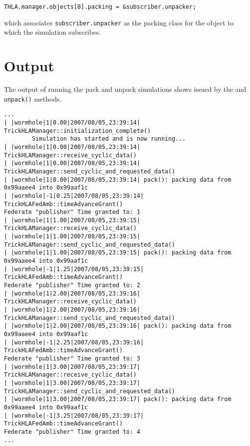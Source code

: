\begin{verbatim}
THLA.manager.objects[0].packing = &subscriber.unpacker; \end{verbatim}

which associates {\tt subscriber.unpacker} as the packing class for
the object to which the simulation subscribes.

\section{Output}

The output of running the pack and unpack simulations
shows issued by the  and
{\tt unpack()} methods.

\begin{lstlisting}[numbers=none,caption={Output from the packer simulation}]
...
| |wormhole|1|0.00|2007/08/05,23:39:14| TrickHLAManager::initialization_complete()
        Simulation has started and is now running...
| |wormhole|1|0.00|2007/08/05,23:39:14| TrickHLAManager::receive_cyclic_data()
| |wormhole|1|0.00|2007/08/05,23:39:14| TrickHLAManager::send_cyclic_and_requested_data()
| |wormhole|1|0.00|2007/08/05,23:39:14| pack(): packing data from 0x99aaee4 into 0x99aaf1c
| |wormhole|-1|0.25|2007/08/05,23:39:14| TrickHLAFedAmb::timeAdvanceGrant()
Federate "publisher" Time granted to: 1
| |wormhole|1|1.00|2007/08/05,23:39:15| TrickHLAManager::receive_cyclic_data()
| |wormhole|1|1.00|2007/08/05,23:39:15| TrickHLAManager::send_cyclic_and_requested_data()
| |wormhole|1|1.00|2007/08/05,23:39:15| pack(): packing data from 0x99aaee4 into 0x99aaf1c
| |wormhole|-1|1.25|2007/08/05,23:39:15| TrickHLAFedAmb::timeAdvanceGrant()
Federate "publisher" Time granted to: 2
| |wormhole|1|2.00|2007/08/05,23:39:16| TrickHLAManager::receive_cyclic_data()
| |wormhole|1|2.00|2007/08/05,23:39:16| TrickHLAManager::send_cyclic_and_requested_data()
| |wormhole|1|2.00|2007/08/05,23:39:16| pack(): packing data from 0x99aaee4 into 0x99aaf1c
| |wormhole|-1|2.25|2007/08/05,23:39:16| TrickHLAFedAmb::timeAdvanceGrant()
Federate "publisher" Time granted to: 3
| |wormhole|1|3.00|2007/08/05,23:39:17| TrickHLAManager::receive_cyclic_data()
| |wormhole|1|3.00|2007/08/05,23:39:17| TrickHLAManager::send_cyclic_and_requested_data()
| |wormhole|1|3.00|2007/08/05,23:39:17| pack(): packing data from 0x99aaee4 into 0x99aaf1c
| |wormhole|-1|3.25|2007/08/05,23:39:17| TrickHLAFedAmb::timeAdvanceGrant()
Federate "publisher" Time granted to: 4
...
\end{lstlisting}

